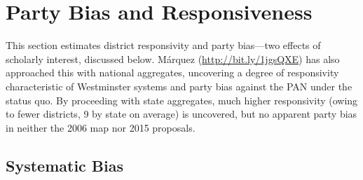 \documentclass[letter,12pt]{article}
\begin{document}



\section{Party Bias and Responsiveness}

This section estimates district responsivity and party bias---two effects of scholarly interest, discussed below. M\'arquez (\href{http://bit.ly/1jgsQXE}{\url{http://bit.ly/1jgsQXE}}) has also approached this with national aggregates, uncovering a degree of responsivity characteristic of Westminster systems and party bias against the PAN under the status quo. By proceeding with state aggregates, much higher responsivity (owing to fewer districts, 9 by state on average) is uncovered, but no apparent party bias in neither the 2006 map nor 2015 proposals. 

\subsection{Systematic Bias}
\end{document}
